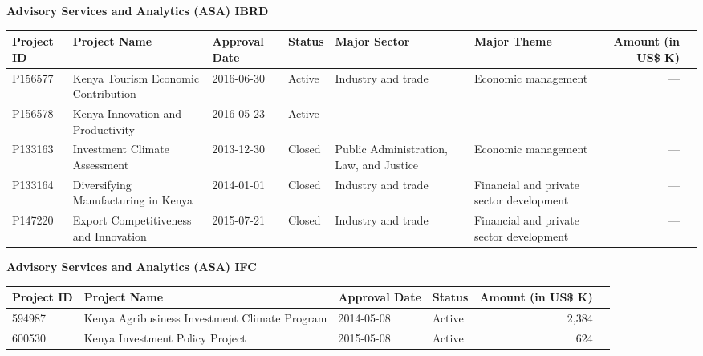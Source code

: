 \documentclass{article}\usepackage[]{graphicx}\usepackage[]{color}
\begin{document}
\begin{minipage}[b]{0.99\textwidth}
\begin{minipage}[b]{0.99\textwidth}
\begin{minipage}[c]{0.99\textwidth}
     \vspace*{0.5cm}
     \end{minipage}
     
     \begin{minipage}[c]{0.99\textwidth} %
     \raggedright{\color{white!30!blue} \textbf{\large Advisory Services and Analytics (ASA) IBRD}}
     \vspace*{0.5cm}
     
{\footnotesize
\begin{tabular}{l>{\raggedright}p{1in}ll>{\raggedright}p{1in}>{\raggedright}p{1in}rl}
 Project ID & Project Name & Approval Date & Status & Major Sector & Major Theme & Amount (in US\$ K) &  \\ 
  \hline
P156577 & Kenya Tourism Economic Contribution & 2016-06-30 & Active & Industry and trade & Economic management & --- &  \\ 
  P156578 & Kenya Innovation and Productivity & 2016-05-23 & Active & --- & --- & --- &  \\ 
  P133163 & Investment Climate Assessment & 2013-12-30 & Closed & Public Administration, Law, and Justice & Economic management & --- &  \\ 
  P133164 & Diversifying Manufacturing in Kenya & 2014-01-01 & Closed & Industry and trade & Financial and private sector development & --- &  \\ 
  P147220 & Export Competitiveness and Innovation & 2015-07-21 & Closed & Industry and trade & Financial and private sector development & --- &  \\ 
  \end{tabular}
}

     \vspace*{0.5cm}
     \end{minipage}
     
     \begin{minipage}[c]{0.99\textwidth} %
     \raggedright{\color{white!30!blue} \textbf{\large Advisory Services and Analytics (ASA) IFC}}
     \vspace*{0.5cm}
     
{\small
\begin{tabular}{l>{\raggedright}p{2.5in}llrl}
 Project ID & Project Name & Approval Date & Status & Amount (in US\$ K) &  \\ 
  \hline
594987 & Kenya Agribusiness Investment Climate Program & 2014-05-08 & Active & 2,384 &  \\ 
  600530 & Kenya Investment Policy Project & 2015-05-08 & Active &   624 &  \\ 
  \end{tabular}
}

     \vspace*{0.5cm}
     \end{minipage}
     
    \end{minipage}
\end{minipage}
 
\end{document}
